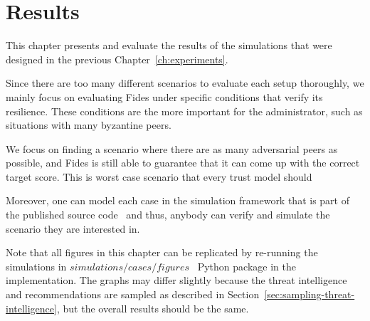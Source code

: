 \chapter{Results}
\label{ch:results}

This chapter presents and evaluate the results of the simulations that were designed in the previous Chapter~\ref{ch:experiments}. 

Since there are too many different scenarios to evaluate each setup thoroughly, we mainly focus on evaluating Fides under specific conditions that verify its resilience. These conditions are the more important for the administrator, such as situations with many byzantine peers.

We focus on finding a scenario where there are as many adversarial peers as possible, and Fides is still able to guarantee that it can come up with the correct target score. This is worst case scenario that every trust model should 


Moreover, one can model each case in the simulation framework that is part of the published source code~\cite{fidesGithub} and thus, anybody can verify and simulate the scenario they are interested in.



Note that all figures in this chapter can be replicated by re-running the simulations in $simulations/cases/figures$~\cite{fidesGithub} Python package in the implementation.
The graphs may differ slightly because the threat intelligence and recommendations are sampled as described in Section~\ref{sec:sampling-threat-intelligence}, but the overall results should be the same.





